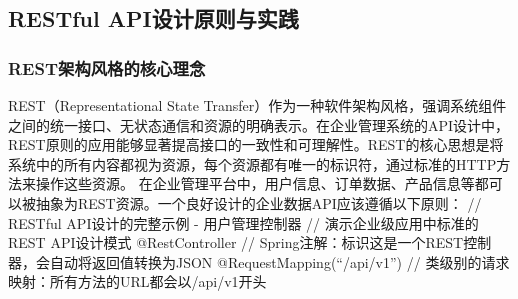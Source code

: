 \subsection{RESTful API设计原则与实践}\label{restful-apiux8bbeux8ba1ux539fux5219ux4e0eux5b9eux8df5}
\subsubsection{REST架构风格的核心理念}\label{restux67b6ux6784ux98ceux683cux7684ux6838ux5fc3ux7406ux5ff5} REST（Representational
State
Transfer）作为一种软件架构风格，强调系统组件之间的统一接口、无状态通信和资源的明确表示。在企业管理系统的API设计中，REST原则的应用能够显著提高接口的一致性和可理解性。REST的核心思想是将系统中的所有内容都视为资源，每个资源都有唯一的标识符，通过标准的HTTP方法来操作这些资源。
在企业管理平台中，用户信息、订单数据、产品信息等都可以被抽象为REST资源。一个良好设计的企业数据API应该遵循以下原则： // RESTful API设计的完整示例 - 用户管理控制器 // 演示企业级应用中标准的REST API设计模式
@RestController // Spring注解：标识这是一个REST控制器，会自动将返回值转换为JSON @RequestMapping(``/api/v1'') // 类级别的请求映射：所有方法的URL都会以/api/v1开头
